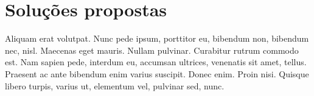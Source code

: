 \section{Soluções propostas} \label{sec:solution}

Aliquam erat volutpat. Nunc pede ipsum, porttitor eu, bibendum non,
bibendum nec, nisl. Maecenas eget mauris. Nullam pulvinar. Curabitur
rutrum commodo est. Nam sapien pede, interdum eu, accumsan ultrices,
venenatis sit amet, tellus. Praesent ac ante bibendum enim varius
suscipit. Donec enim. Proin nisi. Quisque libero turpis, varius ut,
elementum vel, pulvinar sed, nunc. 
